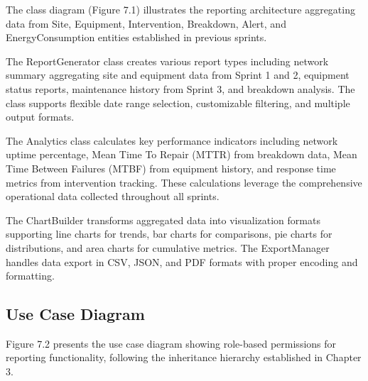 The class diagram (Figure 7.1) illustrates the reporting architecture aggregating data from Site, Equipment, Intervention, Breakdown, Alert, and EnergyConsumption entities established in previous sprints.

The ReportGenerator class creates various report types including network summary aggregating site and equipment data from Sprint 1 and 2, equipment status reports, maintenance history from Sprint 3, and breakdown analysis. The class supports flexible date range selection, customizable filtering, and multiple output formats.

The Analytics class calculates key performance indicators including network uptime percentage, Mean Time To Repair (MTTR) from breakdown data, Mean Time Between Failures (MTBF) from equipment history, and response time metrics from intervention tracking. These calculations leverage the comprehensive operational data collected throughout all sprints.

The ChartBuilder transforms aggregated data into visualization formats supporting line charts for trends, bar charts for comparisons, pie charts for distributions, and area charts for cumulative metrics. The ExportManager handles data export in CSV, JSON, and PDF formats with proper encoding and formatting.

\subsection{Use Case Diagram}

Figure 7.2 presents the use case diagram showing role-based permissions for reporting functionality, following the inheritance hierarchy established in Chapter 3.

